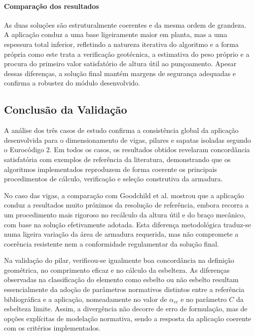 \paragraph{Comparação dos resultados}

As duas soluções são estruturalmente coerentes e da mesma ordem de grandeza. A aplicação conduz a uma base ligeiramente maior em planta, mas a uma espessura total inferior, refletindo a natureza iterativa do algoritmo e a forma própria como este trata a verificação geotécnica, a estimativa do peso próprio e a procura do primeiro valor satisfatório de altura útil ao punçoamento. Apesar dessas diferenças, a solução final mantém margens de segurança adequadas e confirma a robustez do módulo desenvolvido.

\subsection{Conclusão da Validação}

A análise dos três casos de estudo confirma a consistência global da aplicação desenvolvida para o dimensionamento de vigas, pilares e sapatas isoladas segundo o Eurocódigo 2. Em todos os casos, os resultados obtidos revelaram concordância satisfatória com exemplos de referência da literatura, demonstrando que os algoritmos implementados reproduzem de forma coerente os principais procedimentos de cálculo, verificação e seleção construtiva da armadura.

No caso das vigas, a comparação com Goodchild et al. mostrou que a aplicação conduz a resultados muito próximos da resolução de referência, embora recorra a um procedimento mais rigoroso no recálculo da altura útil e do braço mecânico, com base na solução efetivamente adotada. Esta diferença metodológica traduz-se numa ligeira variação da área de armadura requerida, mas não compromete a coerência resistente nem a conformidade regulamentar da solução final.

Na validação do pilar, verificou-se igualmente boa concordância na definição geométrica, no comprimento eficaz e no cálculo da esbelteza. As diferenças observadas na classificação do elemento como esbelto ou não esbelto resultam essencialmente da adoção de parâmetros normativos distintos entre a referência bibliográfica e a aplicação, nomeadamente no valor de $\alpha_{cc}$ e no parâmetro $C$ da esbelteza limite. Assim, a divergência não decorre de erro de formulação, mas de opções explícitas de modelação normativa, sendo a resposta da aplicação coerente com os critérios implementados.

